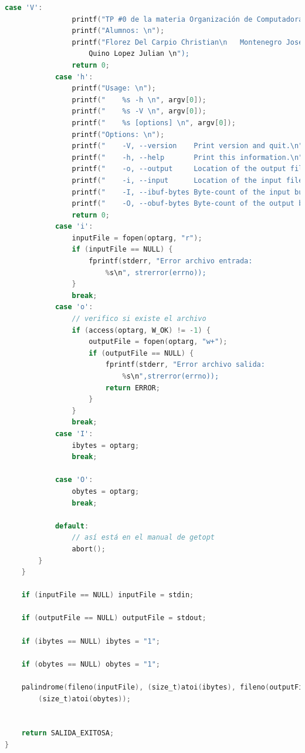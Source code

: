 \documentclass[a4paper]{article}
\begin{document}
\begin{lstlisting}[language=C]
            case 'V':
                printf("TP #0 de la materia Organización de Computadoras \n");
                printf("Alumnos: \n");
                printf("Florez Del Carpio Christian\n	Montenegro Josefina \n	
                	Quino Lopez Julian \n");
                return 0;
            case 'h':
                printf("Usage: \n");
                printf("	%s -h \n", argv[0]);
                printf("	%s -V \n", argv[0]);
                printf("	%s [options] \n", argv[0]);
                printf("Options: \n");
                printf("	-V, --version    Print version and quit.\n");
                printf("	-h, --help       Print this information.\n");
                printf("	-o, --output     Location of the output file.\n");
                printf("	-i, --input      Location of the input file.\n");
                printf("    -I, --ibuf-bytes Byte-count of the input buffer.\n");
                printf("    -O, --obuf-bytes Byte-count of the output buffer.\n");
                return 0;
            case 'i':
                inputFile = fopen(optarg, "r");
                if (inputFile == NULL) {
                    fprintf(stderr, "Error archivo entrada: 
                    	%s\n", strerror(errno));
                }
                break;
            case 'o':
                // verifico si existe el archivo
                if (access(optarg, W_OK) != -1) {
                    outputFile = fopen(optarg, "w+");
                    if (outputFile == NULL) {
                        fprintf(stderr, "Error archivo salida: 
                        	%s\n",strerror(errno));
                        return ERROR;
                    }
                }
                break;
            case 'I':
                ibytes = optarg;
                break;
            
            case 'O':
                obytes = optarg;
                break;
            
            default:
                // así está en el manual de getopt
                abort();
        }
    }

    if (inputFile == NULL) inputFile = stdin;

    if (outputFile == NULL) outputFile = stdout;

    if (ibytes == NULL) ibytes = "1";

    if (obytes == NULL) obytes = "1";

    palindrome(fileno(inputFile), (size_t)atoi(ibytes), fileno(outputFile), 
    	(size_t)atoi(obytes));


    return SALIDA_EXITOSA;
}

\end{lstlisting}
\end{document}
